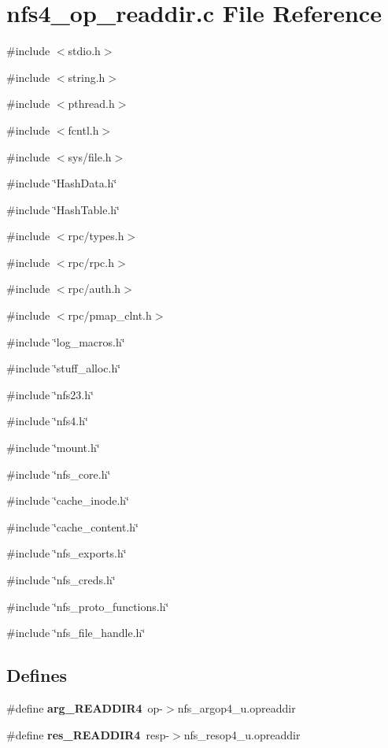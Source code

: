 \section{nfs4\_\-op\_\-readdir.c File Reference}
\label{nfs4__op__readdir_8c}
{\ttfamily \#include $<$stdio.h$>$}\par
{\ttfamily \#include $<$string.h$>$}\par
{\ttfamily \#include $<$pthread.h$>$}\par
{\ttfamily \#include $<$fcntl.h$>$}\par
{\ttfamily \#include $<$sys/file.h$>$}\par
{\ttfamily \#include \char`\"{}HashData.h\char`\"{}}\par
{\ttfamily \#include \char`\"{}HashTable.h\char`\"{}}\par
{\ttfamily \#include $<$rpc/types.h$>$}\par
{\ttfamily \#include $<$rpc/rpc.h$>$}\par
{\ttfamily \#include $<$rpc/auth.h$>$}\par
{\ttfamily \#include $<$rpc/pmap\_\-clnt.h$>$}\par
{\ttfamily \#include \char`\"{}log\_\-macros.h\char`\"{}}\par
{\ttfamily \#include \char`\"{}stuff\_\-alloc.h\char`\"{}}\par
{\ttfamily \#include \char`\"{}nfs23.h\char`\"{}}\par
{\ttfamily \#include \char`\"{}nfs4.h\char`\"{}}\par
{\ttfamily \#include \char`\"{}mount.h\char`\"{}}\par
{\ttfamily \#include \char`\"{}nfs\_\-core.h\char`\"{}}\par
{\ttfamily \#include \char`\"{}cache\_\-inode.h\char`\"{}}\par
{\ttfamily \#include \char`\"{}cache\_\-content.h\char`\"{}}\par
{\ttfamily \#include \char`\"{}nfs\_\-exports.h\char`\"{}}\par
{\ttfamily \#include \char`\"{}nfs\_\-creds.h\char`\"{}}\par
{\ttfamily \#include \char`\"{}nfs\_\-proto\_\-functions.h\char`\"{}}\par
{\ttfamily \#include \char`\"{}nfs\_\-file\_\-handle.h\char`\"{}}\par
\subsection*{Defines}
\begin{DoxyCompactItemize}
\item 
\#define {\bf arg\_\-READDIR4}~op-\/$>$nfs\_\-argop4\_\-u.opreaddir
\item 
\#define {\bf res\_\-READDIR4}~resp-\/$>$nfs\_\-resop4\_\-u.opreaddir
\end{DoxyCompactItemize}
